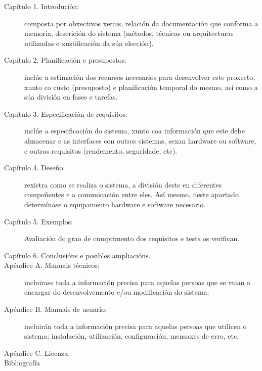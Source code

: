 \begin{description}
\item[Capítulo 1. Introdución:] composta por obxectivos xerais, relación da documentación que conforma a memoria, descrición do sistema (métodos, técnicas ou arquitecturas utilizadas e xustificación da súa elección).
\item[Capítulo 2. Planificación e presupostos:] inclúe a estimación dos recursos necesarios para desenvolver este proxecto, xunto co custo (presuposto) e planificación temporal do mesmo, así como a súa división en fases e tarefas.
\item[Capítulo 3. Especificación de requisitos:] inclúe a especificación do sistema, xunto coa información que este debe almacenar e as interfaces con outros sistemas, sexan hardware ou software, e outros requisitos (rendemento, seguridade, etc).
\item[Capítulo 4. Deseño:] rexistra como se realiza o sistema, a división deste en diferentes compoñentes e a comunicación entre eles. Así mesmo, neste apartado determínase o equipamento hardware e software necesario.
\item[Capítulo 5. Exemplos:] Avaliación do grao de cumprimento dos requisitos e tests os verifican.
\item[Capítulo 6. Conclusións e posibles ampliacións.]
\item[Apéndice A. Manuais técnicos:] incluirase toda a información precisa para aquelas persoas que se vaian a encargar do desenvolvemento e/ou modificación do sistema.
\item[Apéndice B. Manuais de usuario:] incluirán toda a información precisa para aquelas persoas que utilicen o sistema: instalación, utilización, configuración, mensaxes de erro, etc.
\item[Apéndice C. Licenza.]
\item[Bibliografía]
\end{description} 